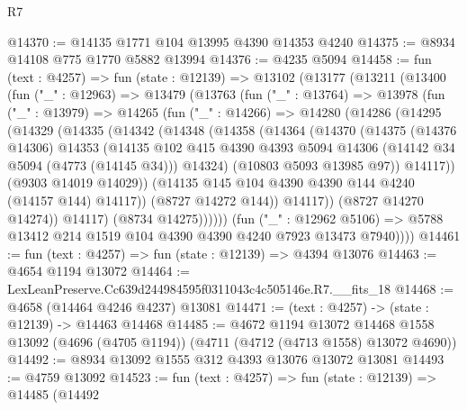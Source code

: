 \begin{lexlean}{R7}
\begin{coremodule}
@14370 := @14135 @1771 @104 @13995 @4390 @14353 @4240
@14375 := @8934 @14108 @775 @1770 @5882 @13994
@14376 := @4235 @5094
@14458 := fun (text : @4257) =>
  fun (state : @12139) =>
  @13102
    (@13177
      (@13211
        (@13400
          (fun ("_" : @12963) =>
          @13479
            (@13763
              (fun ("_" : @13764) =>
              @13978
                (fun ("_" : @13979) =>
                @14265
                  (fun ("_" : @14266) =>
                  @14280
                    (@14286
                      (@14295
                        (@14329
                          (@14335
                            (@14342
                              (@14348
                                (@14358
                                  (@14364
                                    (@14370
                                      (@14375
                                        (@14376 @14306)
                                        @14353
                                        (@14135
                                          @102
                                          @415
                                          @4390
                                          @4393
                                          @5094
                                          @14306
                                          (@14142 @34 @5094 (@4773 (@14145 @34)))
                                          @14324)
                                        (@10803 @5093 @13985 @97))
                                      @14117))
                                  (@9303 @14019 @14029))
                                (@14135 @145 @104 @4390 @4390 @144 @4240 (@14157 @144) @14117))
                              (@8727 @14272 @144))
                            @14117))
                        (@8727 @14270 @14274))
                      @14117)
                    (@8734 @14275))))))
          (fun ("_" : @12962 @5106) =>
          @5788 @13412 @214 @1519 @104 @4390 @4390 @4240 @7923 @13473 @7940))))
@14461 := fun (text : @4257) => fun (state : @12139) => @4394 @13076
@14463 := @4654 @1194 @13072
@14464 := LexLeanPreserve.Cc639d244984595f0311043c4c505146e.R7.__fits_18
@14468 := @4658 (@14464 @4246 @4237) @13081
@14471 := (text : @4257) -> (state : @12139) -> @14463 @14468
@14485 := @4672
    @1194
    @13072
    @14468
    @1558
    @13092
    (@4696 (@4705 @1194))
    (@4711 (@4712 (@4713 @1558) @13072 @4690))
@14492 := @8934 @13092 @1555 @312 @4393 @13076 @13072 @13081
@14493 := @4759 @13092
@14523 := fun (text : @4257) =>
  fun (state : @12139) =>
  @14485
    (@14492

\end{coremodule}
\end{lexlean}
